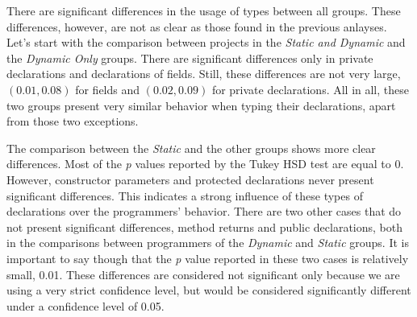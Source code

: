 \documentclass[msc]{ppgccufmg}
\begin{document}
There are significant differences in the usage of types between all groups.
These differences, however, are not as clear as those found in the previous anlayses.
Let's start with the comparison between projects in the \emph{Static and Dynamic} and the \emph{Dynamic Only} groups.
There are significant differences only in private declarations and declarations of fields.
Still, these differences are not very large, $(0.01,0.08)$ for fields and $(0.02,0.09)$ for private declarations.
All in all, these two groups present very similar behavior when typing their declarations, apart from those two exceptions.
                

The comparison between the \emph{Static} and the other groups shows more clear differences.
Most of the \emph{p} values reported by the Tukey HSD test are equal to 0.
However, constructor parameters and protected declarations never present significant differences.
This indicates a strong influence of these types of declarations over the programmers' behavior.
There are two other cases that do not present significant differences, method returns and public declarations, both in the comparisons between programmers of the \emph{Dynamic} and \emph{Static} groups.
It is important to say though that the \emph{p} value reported in these two cases is relatively small, 0.01.
These differences are considered not significant only because we are using a very strict confidence level, but would be considered significantly different under a confidence level of 0.05.
\end{document}

